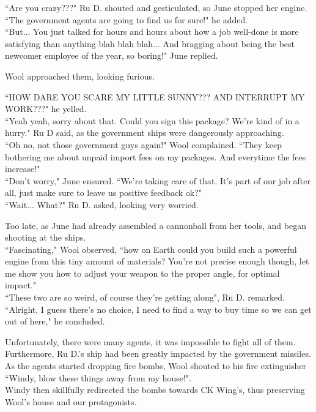 ``Are you crazy???" Ru D. shouted and gesticulated, so June stopped her engine. ``The government agents are going to find us for sure!" he added.\\
``But... You just talked for hours and hours about how a job well-done is more satisfying than anything blah blah blah... And bragging about being the best newcomer employee of the year, so boring!" June replied.


Wool approached them, looking furious.

``HOW DARE YOU SCARE MY LITTLE SUNNY??? AND INTERRUPT MY WORK???" he yelled.\\
``Yeah yeah, sorry about that. Could you sign this package? We're kind of in a hurry." Ru D said, as the government ships were dangerously approaching.\\
``Oh no, not those government guys again!" Wool complained. ``They keep bothering me about unpaid import fees on my packages. And everytime the fees increase!"\\
``Don't worry," June ensured. ``We're taking care of that. It's part of our job after all, just make sure to leave us positive feedback ok?"\\
``Wait... What?" Ru D. asked, looking very worried.


Too late, as June had already assembled a cannonball from her tools, and began shooting at the ships.\\
``Fascinating," Wool observed, ``how on Earth could you build such a powerful engine from this tiny amount of materials? You're not precise enough though, let me show you how to adjust your weapon to the proper angle, for optimal impact."\\
``These two are so weird, of course they're getting along", Ru D. remarked. ``Alright, I guess there's no choice, I need to find a way to buy time so we can get out of here," he concluded.


Unfortunately, there were many agents, it was impossible to fight all of them. Furthermore, Ru D.'s ship had been greatly impacted by the government missiles.
As the agents started dropping fire bombs, Wool shouted to his fire extinguisher ``Windy, blow these things away from my house!". \\ 
Windy then skillfully redirected the bombs towards CK Wing's, thus preserving Wool's house and our protagonists.


